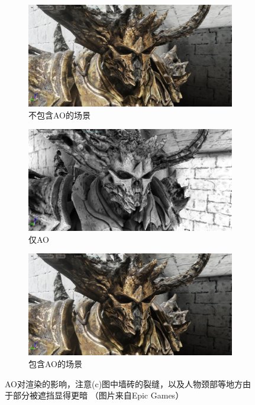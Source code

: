\begin{figure}
\begin{fullwidth}
	\begin{subfigure}[b]{0.325\thewidth}
		\includegraphics[width=1.\textwidth]{figures/intro/ao-1}
		\caption{不包含AO的场景}
	\end{subfigure}
	\begin{subfigure}[b]{0.325\thewidth}
		\includegraphics[width=1.\textwidth]{figures/intro/ao-2}
		\caption{仅AO}
	\end{subfigure}
	\begin{subfigure}[b]{0.325\thewidth}
		\includegraphics[width=1.\textwidth]{figures/intro/ao-3}
		\caption{包含AO的场景}
	\end{subfigure}
\caption{AO对渲染的影响，注意(c)图中墙砖的裂缝，以及人物颈部等地方由于部分被遮挡显得更暗 （图片来自Epic Games）}
\label{f:intro-ao}
\end{fullwidth}
\end{figure}


